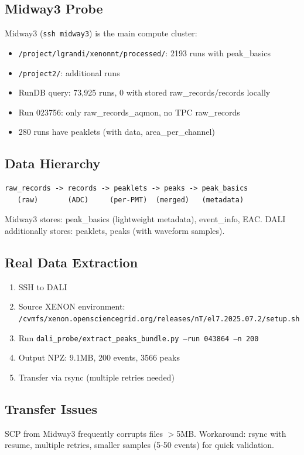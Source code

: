 \documentclass[12pt,a4paper]{article}
\begin{document}
\subsection{Midway3 Probe}
Midway3 (\texttt{ssh midway3}) is the main compute cluster:
\begin{itemize}[itemsep=2pt]
\item \texttt{/project/lgrandi/xenonnt/processed/}: 2193 runs with peak\_basics
\item \texttt{/project2/}: additional runs
\item RunDB query: 73,925 runs, 0 with stored raw\_records/records locally
\item Run 023756: only raw\_records\_aqmon, no TPC raw\_records
\item 280 runs have peaklets (with data, area\_per\_channel)
\end{itemize}

\subsection{Data Hierarchy}
\begin{lstlisting}[language=text]
raw_records -> records -> peaklets -> peaks -> peak_basics
   (raw)       (ADC)     (per-PMT)  (merged)   (metadata)
\end{lstlisting}
Midway3 stores: peak\_basics (lightweight metadata), event\_info, EAC. DALI additionally stores: peaklets, peaks (with waveform samples).

\subsection{Real Data Extraction}
\begin{enumerate}[itemsep=2pt]
\item SSH to DALI
\item Source XENON environment: \texttt{/cvmfs/xenon.opensciencegrid.org/releases/nT/el7.2025.07.2/setup.sh}
\item Run \texttt{dali\_probe/extract\_peaks\_bundle.py --run 043864 --n 200}
\item Output NPZ: 9.1MB, 200 events, 3566 peaks
\item Transfer via rsync (multiple retries needed)
\end{enumerate}

\subsection{Transfer Issues}
SCP from Midway3 frequently corrupts files $>$5MB. Workaround: rsync with resume, multiple retries, smaller samples (5-50 events) for quick validation.
\end{document}
